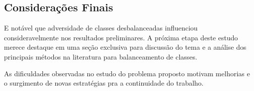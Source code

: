 
\subsection{Considerações Finais}

E notável que adversidade de classes desbalanceadas influenciou consideravelmente nos resultados preliminares.  A próxima etapa deste estudo merece destaque em uma seção exclusiva para discussão do tema e a análise dos principais métodos na literatura para balanceamento de classes.

As dificuldades observadas no estudo do problema proposto motivam melhorias e o surgimento de novas estratégias pra a continuidade do trabalho. 


